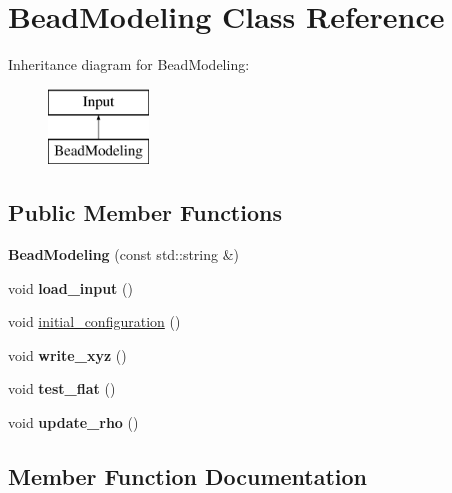 \hypertarget{class_bead_modeling}{}\section{Bead\+Modeling Class Reference}
\label{class_bead_modeling}
Inheritance diagram for Bead\+Modeling\+:\begin{figure}[H]
\begin{center}
\leavevmode
\includegraphics[height=2.000000cm]{class_bead_modeling}
\end{center}
\end{figure}
\subsection*{Public Member Functions}
\begin{DoxyCompactItemize}
\item 
\mbox{\label{class_bead_modeling_ab45be4dc04d0e807c81ea1e23dbe0f35}} 
{\bfseries Bead\+Modeling} (const std\+::string \&)
\item 
\mbox{\label{class_bead_modeling_adce657e5eec3c89340441f056371fb5e}} 
void {\bfseries load\+\_\+input} ()
\item 
void \mbox{\hyperlink{class_bead_modeling_ac9ac9d27a1d414e15f8ab067ceab59ee}{initial\+\_\+configuration}} ()
\item 
\mbox{\label{class_bead_modeling_a15b8378309c0b03cc2f2402786c06633}} 
void {\bfseries write\+\_\+xyz} ()
\item 
\mbox{\label{class_bead_modeling_ae041129d2158d8072f8bd1eb36a66b26}} 
void {\bfseries test\+\_\+flat} ()
\item 
\mbox{\label{class_bead_modeling_ae5cfdfd75670905842acebf27145082f}} 
void {\bfseries update\+\_\+rho} ()
\end{DoxyCompactItemize}


\subsection{Member Function Documentation}
\mbox{\label{class_bead_modeling_ac9ac9d27a1d414e15f8ab067ceab59ee}} 
